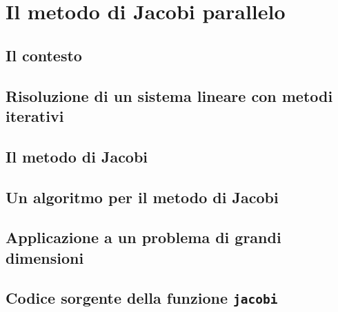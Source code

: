 \documentclass[
	a4paper,
	twoside,
	12pt
]{book}
\begin{document}
\chapter{Il metodo di Jacobi parallelo}
\label{cap3}

\section{Il contesto}

\section{Risoluzione di un sistema lineare con metodi iterativi}

\section{Il metodo di Jacobi}
\label{par:metodoJacobi}

\section{Un algoritmo per il metodo di Jacobi}
\label{par:algoritmoJacobi}

\section{Applicazione a un problema di grandi dimensioni}
\label{par:applicazioneMetodoJacobi}

\nocite{MathWorksIterativeMethods}
\begin{appendix}
\chapter[Codice sorgente della funzione jacobi]{Codice sorgente della funzione \texttt{jacobi}}
\label{app:jacobi}

\end{appendix}
\backmatter
\printbibliography[heading=bibintoc, title={Bibliografia}]
\end{document}
